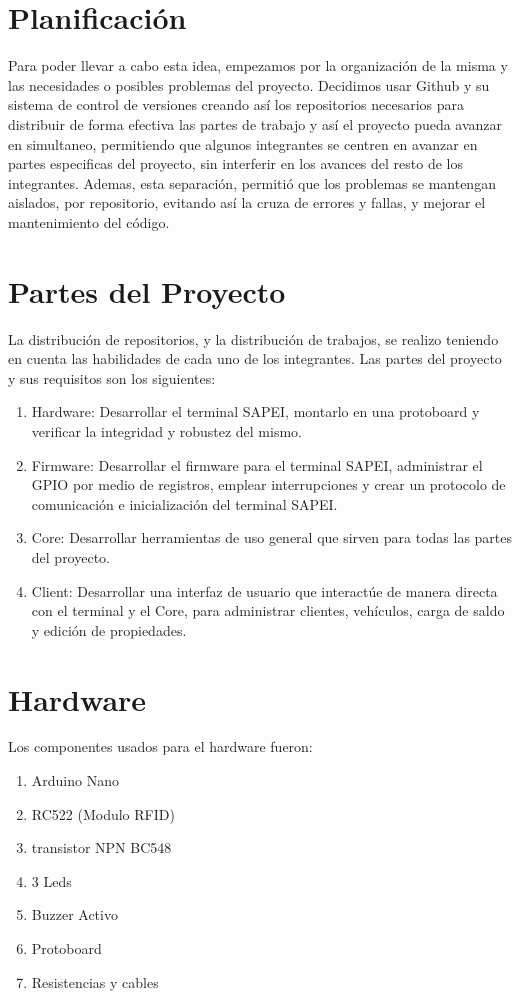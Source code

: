 \documentclass[a4paper, 12pt]{report}
\begin{document}
\newpage
\section{Planificación}
    Para poder llevar a cabo esta idea, empezamos por la organización de la misma y las necesidades o posibles
    problemas del proyecto. Decidimos usar Github y su sistema de control de versiones
    creando así los repositorios necesarios para distribuir de forma efectiva las partes de trabajo y así el proyecto
    pueda avanzar en simultaneo, permitiendo que algunos integrantes se centren en avanzar en partes especificas
    del proyecto, sin interferir en los avances del resto de los integrantes. Ademas, esta separación, permitió que
    los problemas se mantengan aislados, por repositorio, evitando así la cruza de errores y fallas, y mejorar el
    mantenimiento del código.

\section{Partes del Proyecto}
    La distribución de repositorios, y la distribución de trabajos, se realizo teniendo en cuenta las habilidades de
    cada uno de los integrantes. Las partes del proyecto y sus requisitos son los siguientes:
    \begin{enumerate}
        \item Hardware: Desarrollar el terminal SAPEI, montarlo en una protoboard y verificar la integridad y robustez
            del mismo.
        \item Firmware: Desarrollar el firmware para el terminal SAPEI, administrar el GPIO por medio de registros,
            emplear interrupciones y crear un protocolo de comunicación e inicialización del terminal SAPEI.
        \item Core: Desarrollar herramientas de uso general que sirven para todas las partes del proyecto.
        \item Client: Desarrollar una interfaz de usuario que interactúe de manera directa con el terminal y el Core,
            para administrar clientes, vehículos, carga de saldo y edición de propiedades.
    \end{enumerate}

\newpage
\section{Hardware}
    Los componentes usados para el hardware fueron:
    \begin{enumerate}
        \item Arduino Nano
        \item RC522 (Modulo RFID)
        \item transistor NPN BC548
        \item 3 Leds
        \item Buzzer Activo
        \item Protoboard
        \item Resistencias y cables
    \end{enumerate}
\end{document}
